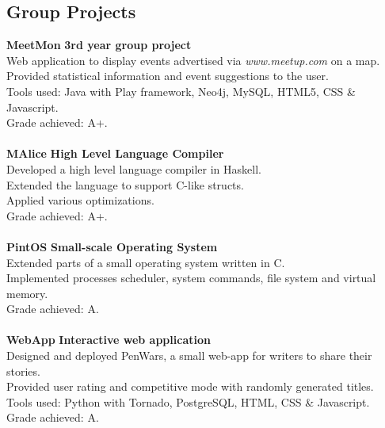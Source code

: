 \documentclass[a4paper,10pt]{article}
\begin{document}
\subsection*{Group Projects}
\begin{tabbing}
{\bf MeetMon} \hspace{24pt} \= {\bf 3rd year group project}\\
\>Web application to display events advertised via \textit{www.meetup.com} on a map.\\
\>Provided statistical information and event suggestions to the user.\\
\>Tools used: Java with Play framework, Neo4j, MySQL, HTML5, CSS \& Javascript.\\
\>Grade achieved: A+.\\
\\
{\bf MAlice} \> {\bf High Level Language Compiler}\\
\> Developed a high level language compiler in Haskell.\\
\> Extended the language to support C-like structs.\\
\> Applied various optimizations.\\
\> Grade achieved: A+.\\
\\
{\bf PintOS} \> {\bf Small-scale Operating System}\\
\>Extended parts of a small operating system written in C.\\
\>Implemented processes scheduler, system commands, file system and virtual memory.\\
\>Grade achieved: A.\\
\\
{\bf WebApp} \> {\bf Interactive web application}\\
\> Designed and deployed PenWars, a small web-app for writers to share their stories.\\
\> Provided user rating and competitive mode with randomly generated titles.\\
\> Tools used: Python with Tornado, PostgreSQL, HTML, CSS \& Javascript.\\
\>Grade achieved: A.\\
\end{tabbing}

\pagebreak
\ \\
\vspace{0.5cm}
\end{document}
